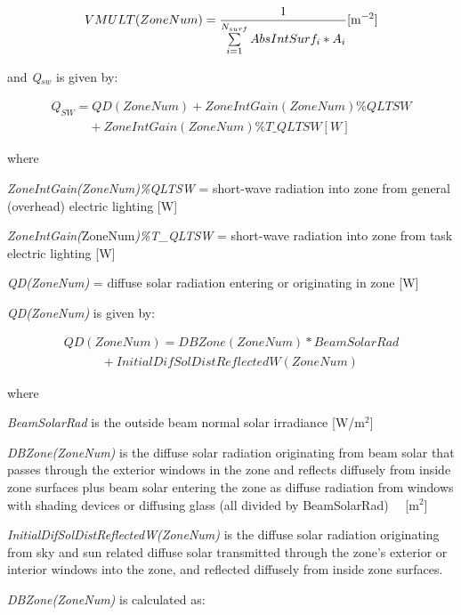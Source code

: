 \begin{equation}
VMULT(ZoneNum) = \frac{1}{{\sum\limits_{i = 1}^{{N_{surf}}} {AbsIntSur{f_i}*{A_i}} }}{\rm{    [}}{{\rm{m}}^{{\rm{ - 2}}}}]
\end{equation}

and \emph{Q\(_{sw}\)} is given by:

\begin{equation}
\begin{array}{l}
{Q_{SW}} = QD(ZoneNum) + ZoneIntGain(ZoneNum)\% QLTSW \\
\quad \quad \quad + ZoneIntGain(ZoneNum)\% T\_QLTSW [W]
\end{array}
\end{equation}

where

\emph{ZoneIntGain(ZoneNum)\%QLTSW} = short-wave radiation into zone from general (overhead) electric lighting {[}W{]}

\emph{ZoneIntGain(}ZoneNum\emph{)\%T\_QLTSW} = short-wave radiation into zone from task electric lighting {[}W{]}

\emph{QD(ZoneNum)} = diffuse solar radiation entering or originating in zone {[}W{]}

\emph{QD(ZoneNum)} is given by:

\begin{equation}
\begin{array}{l}
QD(ZoneNum) = DBZone(ZoneNum)*BeamSolarRad \\
\quad \quad \quad + InitialDifSolDistReflectedW(ZoneNum)
\end{array}
\end{equation}

where

\emph{BeamSolarRad} is the outside beam normal solar irradiance {[}W/m\(^{2}\){]}

\emph{DBZone(ZoneNum)} is the diffuse solar radiation originating from beam solar that passes through the exterior windows in the zone and reflects diffusely from inside zone surfaces plus beam solar entering the zone as diffuse radiation from windows with shading devices or diffusing glass (all divided by BeamSolarRad)~~ {[}m\(^{2}\){]}

\emph{InitialDifSolDistReflectedW(ZoneNum)} is the diffuse solar radiation originating from sky and sun related diffuse solar transmitted through the zone's exterior or interior windows into the zone, and reflected diffusely from inside zone surfaces.

\emph{DBZone(ZoneNum)} is calculated as:

